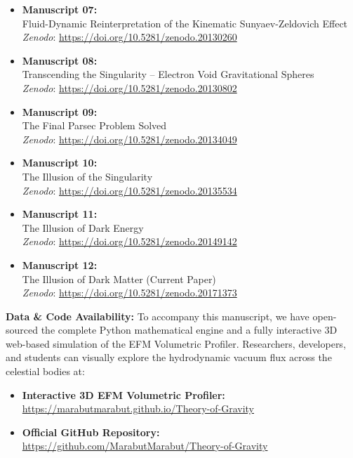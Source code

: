 \documentclass[11pt, a4paper, table]{article}
\begin{document}
\begin{itemize}
    \item \textbf{Manuscript 07:} \\ Fluid-Dynamic Reinterpretation of the Kinematic Sunyaev-Zeldovich Effect \\ \textit{Zenodo}: \url{https://doi.org/10.5281/zenodo.20130260}

    \item \textbf{Manuscript 08:} \\ Transcending the Singularity -- Electron Void Gravitational Spheres \\ \textit{Zenodo}: \url{https://doi.org/10.5281/zenodo.20130802}

    \item \textbf{Manuscript 09:} \\ The Final Parsec Problem Solved \\ \textit{Zenodo}: \url{https://doi.org/10.5281/zenodo.20134049}

    \item \textbf{Manuscript 10:} \\ The Illusion of the Singularity \\ \textit{Zenodo}: \url{https://doi.org/10.5281/zenodo.20135534}
    
    \item \textbf{Manuscript 11:} \\ The Illusion of Dark Energy \\ \textit{Zenodo}: \url{https://doi.org/10.5281/zenodo.20149142}
    
    \item \textbf{Manuscript 12:} \\ The Illusion of Dark Matter (Current Paper) \\ \textit{Zenodo}: \url{https://doi.org/10.5281/zenodo.20171373}
  \end{itemize}

  \clearpage
  \vspace{1em}
  \noindent \textbf{Data \& Code Availability:} To accompany this manuscript, we have open-sourced the complete Python mathematical engine and a fully interactive 3D web-based simulation of the EFM Volumetric Profiler. Researchers, developers, and students can visually explore the hydrodynamic vacuum flux across the celestial bodies at: 
  \begin{itemize}
    \item \textbf{Interactive 3D EFM Volumetric Profiler:} \\ \url{https://marabutmarabut.github.io/Theory-of-Gravity}
    
    \item \textbf{Official GitHub Repository:} \\ \url{https://github.com/MarabutMarabut/Theory-of-Gravity}
  \end{itemize}
\end{document}
